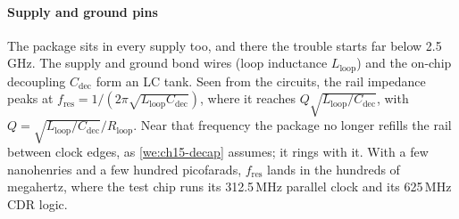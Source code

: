 \paragraph{Supply and ground pins} The package sits in every supply too, and there the trouble starts far below 2.5\,GHz. The supply and ground bond wires (loop inductance $L_\mathrm{loop}$) and the on-chip decoupling $C_\mathrm{dec}$ form an LC tank. Seen from the circuits, the rail impedance peaks at $f_\mathrm{res} = 1/(2\pi\sqrt{L_\mathrm{loop}C_\mathrm{dec}})$, where it reaches $Q\sqrt{L_\mathrm{loop}/C_\mathrm{dec}}$, with $Q = \sqrt{L_\mathrm{loop}/C_\mathrm{dec}}/R_\mathrm{loop}$. Near that frequency the package no longer refills the rail between clock edges, as \cref{we:ch15-decap} assumes; it rings with it. With a few nanohenries and a few hundred picofarads, $f_\mathrm{res}$ lands in the hundreds of megahertz, where the test chip runs its 312.5\,MHz parallel clock and its 625\,MHz CDR logic.

